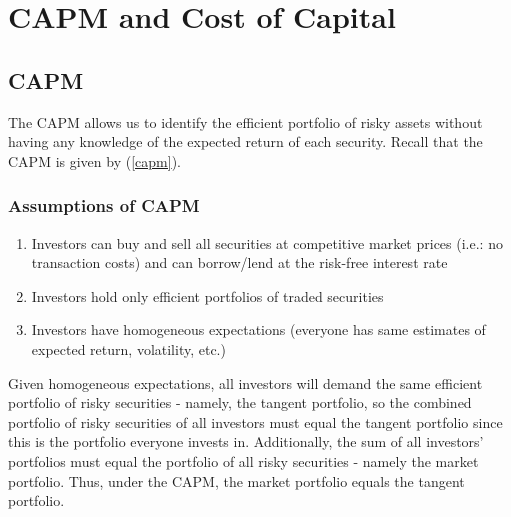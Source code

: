 \documentclass[11pt]{article}
\theoremstyle{definition}
\begin{document}
\section{CAPM and Cost of Capital}
\subsection{CAPM}
The CAPM allows us to identify the efficient portfolio of risky assets without having any knowledge of the expected return of each security. Recall that the CAPM is given by (\ref{capm}).
\subsubsection{Assumptions of CAPM}
\begin{enumerate}
    \item Investors can buy and sell all securities at competitive market prices (i.e.: no transaction costs) and can borrow/lend at the risk-free interest rate
    \item Investors hold only efficient portfolios of traded securities
    \item Investors have homogeneous expectations (everyone has same estimates of expected return, volatility, etc.)
\end{enumerate}
Given homogeneous expectations, all investors will demand the same efficient portfolio of risky securities - namely, the tangent portfolio, so the combined portfolio of risky securities of all investors must equal the tangent portfolio since this is the portfolio everyone invests in. Additionally, the sum of all investors' portfolios must equal the portfolio of all risky securities - namely the market portfolio. Thus, under the CAPM, the market portfolio equals the tangent portfolio.
\end{document}
